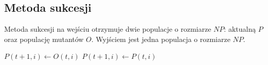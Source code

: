 \documentclass[12pt, a4paper]{article}
\begin{document}
\subsection{Metoda sukcesji}

Metoda sukcesji na wejściu otrzymuje dwie populacje o rozmiarze $NP$: aktualną $P$ oraz populację mutantów $O$.
Wyjściem jest jedna populacja o rozmiarze $NP$.

\begin{algorithm}[!htb]
\begin{algorithmic}[1]
      \State $P(t+1, i) \gets O(t, i)$
    \Else
      \State $P(t+1, i) \gets P(t, i)$
    \EndIf
  \EndFor
\EndFunction
\end{algorithmic}
\end{algorithm}

\nocite{*}


\end{document}
